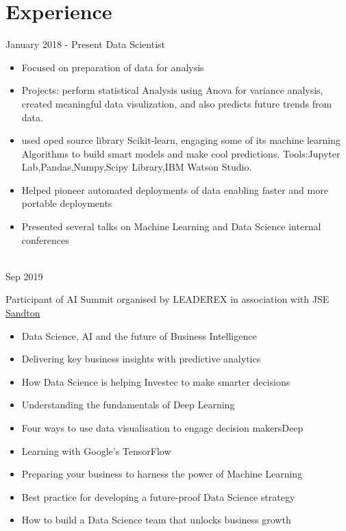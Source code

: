 \documentclass[letterpaper]{twentysecondcv} %
\begin{document}
\makeprofile %
 

\section{Experience}

\begin{twenty} %
\twentyitem
    	{January 2018 -}
		{Present}
        {Data Scientist}
        
        {}
        {\begin{itemize}
        \item Focused on preparation of data for analysis
        \item Projects: perform statistical Analysis using Anova for variance analysis, created meaningful data visulization, and also predicts future trends from data.
        \item used oped source library Scikit-learn, engaging some of its machine learning Algorithms to build smart models and make cool predictions. 
        Tools:Jupyter Lab,Pandas,Numpy,Scipy Library,IBM Watson Studio. 
        
    
        \item Helped pioneer automated deployments of data enabling faster and more portable deployments
        \item Presented several talks on Machine Learning and Data Science  internal conferences
        
        \end{itemize}}
        \\
	\twentyitem
    	{Sep 2019}
	
        {Participant of AI Summit organised by LEADEREX in association with JSE}
        {\href{http://www.aisummit.co.za/eventagenda.aspx?s=121&c=55&bc=Data+Science/}{Sandton}}
        {}
        {
        {\begin{itemize}
        \item Data Science, AI and the future of Business Intelligence

        \item Delivering key business insights with predictive analytics
        \item How Data Science is helping Investec to make smarter decisions
        \item Understanding the fundamentals of Deep Learning
        \item Four ways to use data visualisation to engage decision makersDeep \item Learning with Google’s TensorFlow
        \item Preparing your business to harness the power of Machine Learning
        \item Best practice for developing a future-proof Data Science strategy
        \item How to build a Data Science team that unlocks business growth


\end{itemize}}}
\end{twenty}
\end{document}
